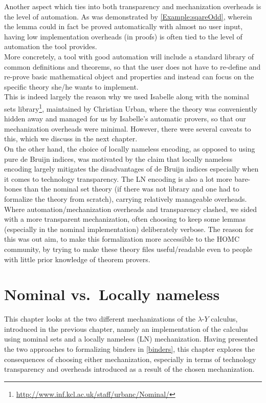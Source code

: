 \documentclass[a4paper, 12pt, twoside]{style/ociamthesis}
\theoremstyle{plain}
\theoremstyle{definition}
\theoremstyle{remark}
\renewcommand{\href}[2]{#2\footnote{\url{#1}}}
\newcommand{\lamy}{\lambda\text{-}Y}
\begin{document}
Another aspect which ties into both transparency and mechanization
overheads is the level of automation. As was demonstrated by
\cref{Example:sqareOdd}, wherein the lemma could in fact be proved
automatically with almost no user input, having low implementation
overheads (in proofs) is often tied to the level of automation the tool
provides.\\
More concretely, a tool with good automation will include a standard
library of common definitions and theorems, so that the user does not
have to re-define and re-prove basic mathematical object and properties
and instead can focus on the specific theory she/he wants to
implement.\\
This is indeed largely the reason why we used Isabelle along with the
\href{http://www.inf.kcl.ac.uk/staff/urbanc/Nominal/}{nominal sets
library}, maintained by Christian Urban, where the theory was
conveniently hidden away and managed for us by Isabelle's automatic
provers, so that our mechanization overheads were minimal. However,
there were several caveats to this, which we discuss in the next
chapter.\\
On the other hand, the choice of locally nameless encoding, as opposed
to using pure de Bruijn indices, was motivated by the claim that locally
nameless encoding largely mitigates the disadvantages of de Bruijn
indices especially when it comes to technology transparency. The LN
encoding is also a lot more bare-bones than the nominal set theory (if
there was not library and one had to formalize the theory from scratch),
carrying relatively manageable overheads.\\
Where automation/mechanization overheads and transparency clashed, we
sided with a more transparent mechanization, often choosing to keep some
lemmas (especially in the nominal implementation) deliberately verbose.
The reason for this was out aim, to make this formalization more
accessible to the HOMC community, by trying to make these theory files
useful/readable even to people with little prior knowledge of theorem
provers.

\chapter{Nominal vs.~Locally nameless}\label{comp-isa}

\label{chap:compIsa}

This chapter looks at the two different mechanizations of the \(\lamy\)
calculus, introduced in the previous chapter, namely an implementation
of the calculus using nominal sets and a locally nameless (LN)
mechanization. Having presented the two approaches to formalizing
binders in \cref{binders}, this chapter explores the consequences of
choosing either mechanization, especially in terms of technology
transparency and overheads introduced as a result of the chosen
mechanization.
\end{document}

